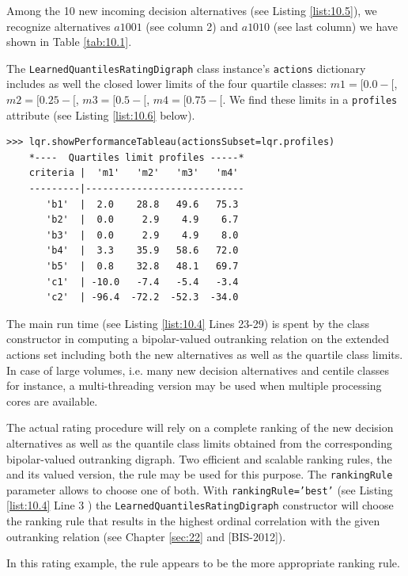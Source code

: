 Among the 10 new incoming decision alternatives (see Listing \ref{list:10.5}), we recognize alternatives $a1001$ (see column 2) and $a1010$ (see last column) we have shown in Table \ref{tab:10.1}.

The \texttt{LearnedQuantilesRatingDigraph} class instance's \texttt{actions} dictionary includes as well the closed lower limits of the four quartile classes: $m1 = [0.0- [$, $m2 = [0.25- [$, $m3 = [0.5- [$, $m4 = [0.75 - [$. We find these limits in a \texttt{profiles} attribute (see Listing \ref{list:10.6} below).

\begin{lstlisting}[caption={Showing the limiting profiles of the rating quantiles},label=list:10.6]
>>> lqr.showPerformanceTableau(actionsSubset=lqr.profiles)
    *----  Quartiles limit profiles -----*
    criteria |  'm1'   'm2'   'm3'   'm4'   
    ---------|----------------------------
       'b1'  |  2.0    28.8   49.6   75.3  
       'b2'  |  0.0     2.9    4.9    6.7  
       'b3'  |  0.0     2.9    4.9    8.0  
       'b4'  |  3.3    35.9   58.6   72.0  
       'b5'  |  0.8    32.8   48.1   69.7  
       'c1'  | -10.0   -7.4   -5.4   -3.4  
       'c2'  | -96.4  -72.2  -52.3  -34.0  
\end{lstlisting}

The main run time (see Listing \ref{list:10.4} Lines 23-29) is spent by the class constructor in computing a bipolar-valued outranking relation on the extended actions set including both the new alternatives as well as the quartile class limits. In case of large volumes, i.e. many new decision alternatives and centile classes for instance, a multi-threading version may be used when multiple processing cores are available.

The actual rating procedure will rely on a complete ranking of the new decision alternatives as well as the quantile class limits obtained from the corresponding bipolar-valued outranking digraph. Two efficient and scalable ranking rules, the \Copeland and its valued version, the \NetFlows rule may be used for this purpose. The \texttt{rankingRule} parameter allows to choose one of both. With \texttt{rankingRule='best'} (see Listing \ref{list:10.4} Line 3 ) the \texttt{LearnedQuantilesRatingDigraph} constructor will choose the ranking rule that results in the highest ordinal correlation with the given outranking relation (see Chapter \ref{sec:22} and [BIS-2012]).

In this rating example, the \Copeland rule appears to be the more appropriate ranking rule.

